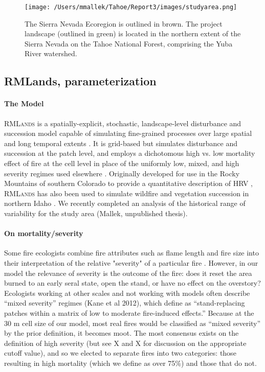 \documentclass[12pt]{article}
\begin{document}
\begin{spacing}{1}
\begin{figure}
\texttt{[image: /Users/mmallek/Tahoe/Report3/images/studyarea.png]}
\caption{The Sierra Nevada Ecoregion is outlined in brown. The project landscape (outlined in green) is located in the northern extent of the Sierra Nevada on the Tahoe National Forest, comprising the Yuba River watershed.}
\label{projectarea}
\end{figure}


\subsection*{RMLands, parameterization}

\paragraph{The Model}
\textsc{RMLands} is a spatially-explicit, stochastic, landscape-level disturbance and succession model capable of simulating fine-grained processes over large spatial and long temporal extents \citep{McGarigal2005}. It is grid-based but simulates disturbance and succession at the patch level, and employs a dichotomous high vs. low mortality effect of fire at the cell level in place of the uniformly low, mixed, and high severity regimes used elsewhere \citep{McGarigal2012}. Originally developed for use in the Rocky Mountains of southern Colorado to provide a quantitative description of HRV \citep{McGarigal2012}, \textsc{RMLands} has also been used to simulate wildfire and vegetation succession in northern Idaho \citep{Cushman2011}. We recently completed an analysis of the historical range of variability for the study area (Mallek, unpublished thesis).

\paragraph{On mortality/severity}
Some fire ecologists combine fire attributes such as flame length and fire size into their interpretation of the relative "severity" of a particular fire \citep{Agee1993}. However, in our model the relevance of severity is the outcome of the fire: does it reset the area burned to an early seral state, open the stand, or have no effect on the overstory?  Ecologists working at other scales and not working with models often describe ``mixed severity'' regimes (Kane et al 2012), which \citet{Collins2010} define as ``stand-replacing patches within a matrix of low to moderate fire-induced effects.'' Because at the 30 m cell size of our model, most real fires would be classified as ``mixed severity'' by the prior definition, it becomes moot. The most consensus exists on the definition of high severity (but see X and X for discussion on the appropriate cutoff value), and so we elected to separate fires into two categories: those resulting in high mortality (which we define as over 75\%) and those that do not.


\end{spacing}
\end{document}
